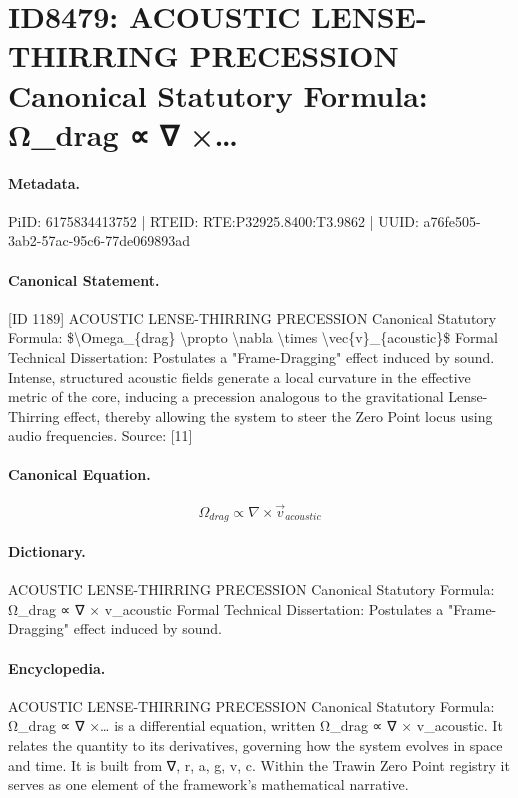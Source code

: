 \section*{ID8479: ACOUSTIC LENSE-THIRRING PRECESSION Canonical Statutory Formula: Ω\_drag ∝ ∇ ×…}
\paragraph{Metadata.}
PiID: 6175834413752 | RTEID: RTE:P32925.8400:T3.9862 | UUID: a76fe505-3ab2-57ac-95c6-77de069893ad

\paragraph{Canonical Statement.}
[ID 1189] ACOUSTIC LENSE-THIRRING PRECESSION Canonical Statutory Formula: \$\textbackslash{}Omega\_\{drag\} \textbackslash{}propto \textbackslash{}nabla \textbackslash{}times \textbackslash{}vec\{v\}\_\{acoustic\}\$ Formal Technical Dissertation: Postulates a "Frame-Dragging" effect induced by sound. Intense, structured acoustic fields generate a local curvature in the effective metric of the core, inducing a precession analogous to the gravitational Lense-Thirring effect, thereby allowing the system to steer the Zero Point locus using audio frequencies. Source: [11]

\paragraph{Canonical Equation.}
\[
\Omega_{drag} \propto \nabla \times \vec{v}_{acoustic}
\]

\paragraph{Dictionary.}
ACOUSTIC LENSE-THIRRING PRECESSION Canonical Statutory Formula: Ω\_drag ∝ ∇ × v\_acoustic Formal Technical Dissertation: Postulates a "Frame-Dragging" effect induced by sound.

\paragraph{Encyclopedia.}
ACOUSTIC LENSE-THIRRING PRECESSION Canonical Statutory Formula: Ω\_drag ∝ ∇ ×… is a differential equation, written Ω\_drag ∝ ∇ × v\_acoustic. It relates the quantity to its derivatives, governing how the system evolves in space and time. It is built from ∇, r, a, g, v, c. Within the Trawin Zero Point registry it serves as one element of the framework's mathematical narrative.
